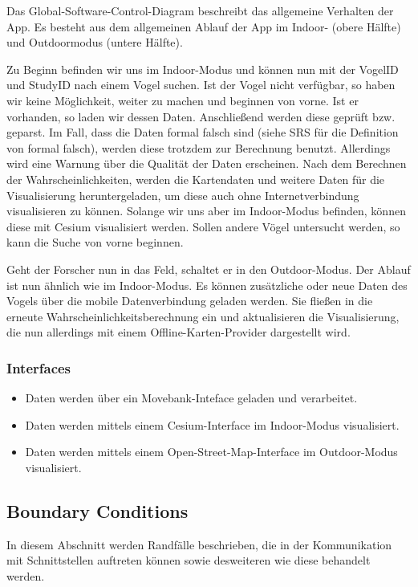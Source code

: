 \documentclass[12pt]{article} %
\begin{document}
\vspace{1em}

Das Global-Software-Control-Diagram beschreibt das allgemeine Verhalten der App. Es besteht aus dem allgemeinen Ablauf der App im Indoor- (obere Hälfte) und Outdoormodus (untere Hälfte). 

Zu Beginn befinden wir uns im Indoor-Modus und können nun mit der VogelID und StudyID nach einem Vogel suchen. Ist der Vogel nicht verfügbar, so haben wir keine Möglichkeit, weiter zu machen und beginnen von vorne. Ist er vorhanden, so laden wir dessen Daten. Anschließend werden diese geprüft bzw. geparst. Im Fall, dass die Daten formal falsch sind (siehe SRS für die Definition von formal falsch), werden diese trotzdem zur Berechnung benutzt. Allerdings wird eine Warnung über die Qualität der Daten erscheinen. Nach dem Berechnen der Wahrscheinlichkeiten, werden die Kartendaten und weitere Daten für die Visualisierung heruntergeladen, um diese auch ohne Internetverbindung visualisieren zu können. Solange wir uns aber im Indoor-Modus befinden, können diese mit Cesium visualisiert werden. Sollen andere Vögel untersucht werden, so kann die Suche von vorne beginnen.

Geht der Forscher nun in das Feld, schaltet er in den Outdoor-Modus. Der Ablauf ist nun ähnlich wie im Indoor-Modus. Es können zusätzliche oder neue Daten des Vogels über die mobile Datenverbindung geladen werden. Sie fließen in die erneute Wahrscheinlichkeitsberechnung ein und aktualisieren die Visualisierung, die nun allerdings mit einem Offline-Karten-Provider dargestellt wird. 

\subsubsection{Interfaces}
\label{sec:interfaces}
\begin{itemize}
	\item Daten werden über ein Movebank-Inteface geladen und verarbeitet. 
	\item Daten werden mittels einem Cesium-Interface im Indoor-Modus visualisiert.
	\item Daten werden mittels einem Open-Street-Map-Interface im Outdoor-Modus visualisiert.
\end{itemize}

\subsection{Boundary Conditions}
In diesem Abschnitt werden Randfälle beschrieben, die in der Kommunikation mit Schnittstellen auftreten können sowie desweiteren wie diese behandelt werden.
\end{document}
